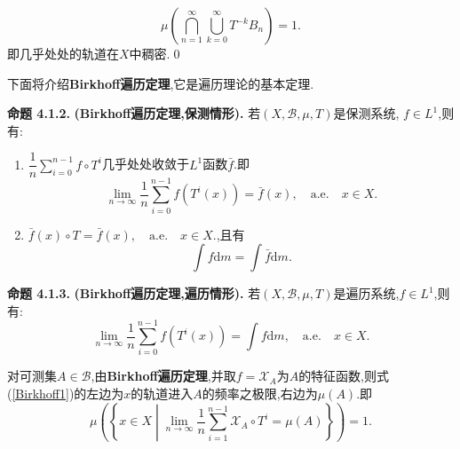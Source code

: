 $$\mu\left(\bigcap_{n=1}^{\infty}\bigcup_{k=0}^{\infty}T^{-k}B_n\right)=1.$$
即几乎处处的轨道在$X$中稠密.\qed
\par
下面将介绍\textbf{Birkhoff遍历定理},它是遍历理论的基本定理.\par
\textbf{命题 4.1.2.  }\textsuperscript{\cite{Ergodic_Sun,Ergodic_theory}}\textbf{(Birkhoff遍历定理,保测情形).  }
若$(X,\mathcal{B},\mu,T)$是保测系统, $f\in L^1$,则有:
\begin{enumerate}
    \item $\dfrac{1}{n}\sum\limits_{i=0}^{n-1}f\circ T^{i}$几乎处处收敛于$L^1$函数$\bar f$.即
          $$\lim_{n\to\infty}\frac{1}{n}\sum\limits_{i=0}^{n-1}f(T^{i}(x))=\bar f(x),\quad \mathrm{a.e.}\quad x\in X.$$
    \item $\bar f(x)\circ T=\bar f(x),\quad \mathrm{a.e.}\quad x\in X.$,且有
          $$\int f\mathrm{d}m =\int \bar f\mathrm{d}m.$$
\end{enumerate}
\par
\textbf{命题 4.1.3.  }\textsuperscript{\cite{Ergodic_Sun,Ergodic_theory}}\textbf{(Birkhoff遍历定理,遍历情形).  }
若$(X,\mathcal{B},\mu,T)$是遍历系统,$f\in L^1$,则有:
\begin{equation}\label{Birkhoff1}
    \lim_{n\to\infty}\frac{1}{n}\sum\limits_{i=0}^{n-1}f(T^{i}(x))=\int f\mathrm{d}m,\quad \mathrm{a.e.}\quad x\in X.
\end{equation}\par
对可测集$A\in\mathcal{B}$,由\textbf{Birkhoff遍历定理},并取$f=\mathcal{X}_A$为$A$的特征函数,则式(\ref{Birkhoff1})的左边为$x$的轨道进入$A$的频率之极限,右边为$\mu(A)$.即
\begin{equation}\label{Birkhoff2}
    \mu\left(\left\{x\in X\middle|\lim_{n\to\infty}\frac{1}{n}\sum_{i=1}^{n-1}\mathcal{X}_A\circ T^{i}=\mu(A)\right\}\right)=1.
\end{equation}
